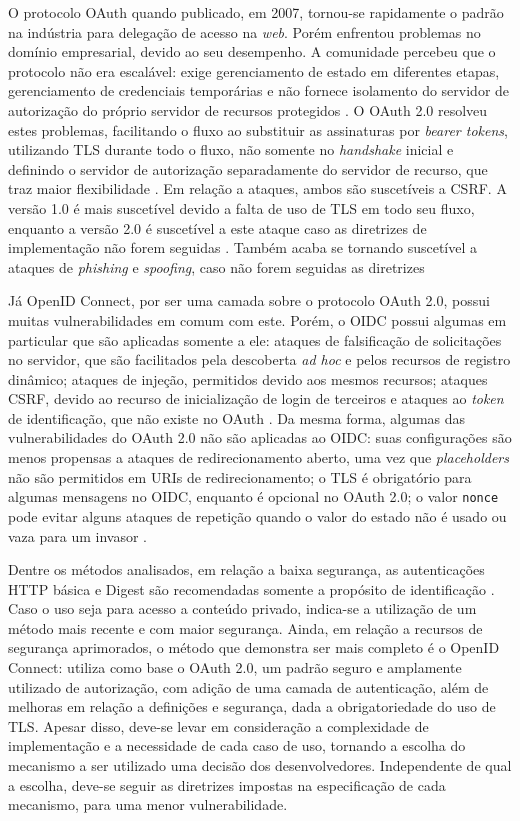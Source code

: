 O protocolo OAuth quando publicado, em 2007, tornou-se rapidamente o padrão na indústria para 
delegação de acesso na \emph{web}. Porém enfrentou problemas no domínio empresarial, devido ao seu desempenho. 
A comunidade percebeu que o protocolo não era escalável: exige gerenciamento de estado em diferentes 
etapas, gerenciamento de credenciais temporárias e não fornece isolamento do servidor de autorização 
do próprio servidor de recursos protegidos \cite{NOUREDDINE2011}. O OAuth 2.0 resolveu estes 
problemas, facilitando o fluxo ao substituir as assinaturas por \emph{bearer tokens}, utilizando TLS 
durante todo o fluxo, não somente no \emph{handshake} inicial e definindo o servidor de autorização 
separadamente do servidor de recurso, que traz maior flexibilidade \cite{SIRIWARDENA2014}.
Em relação a ataques, ambos são suscetíveis a CSRF. A versão 1.0 é mais suscetível devido a 
falta de uso de TLS em todo seu fluxo, enquanto a versão 2.0 é suscetível a este ataque caso as 
diretrizes de implementação não forem seguidas \cite{FETT2016}. Também acaba se tornando suscetível 
a ataques de \emph{phishing} e \emph{spoofing}, caso não forem seguidas as diretrizes \cite{RFC6819}


Já OpenID Connect, por ser uma camada sobre o protocolo OAuth 2.0, possui muitas vulnerabilidades 
em comum com este. Porém, o OIDC possui algumas em particular que são aplicadas somente a
ele: ataques de falsificação de solicitações no servidor, que são facilitados pela descoberta 
\emph{ad hoc} e pelos recursos de registro dinâmico; ataques de injeção, permitidos devido aos mesmos
recursos; ataques CSRF, devido ao recurso de inicialização de login de terceiros e ataques ao
\emph{token} de identificação, que não existe no OAuth \cite{FETT2017}.
Da mesma forma, algumas das vulnerabilidades do OAuth 2.0 não são aplicadas ao OIDC: 
suas configurações são menos propensas a ataques de redirecionamento aberto, uma vez que 
\emph{placeholders} não são permitidos em URIs de redirecionamento; o TLS é obrigatório para 
algumas mensagens no OIDC, enquanto é opcional no OAuth 2.0; o valor \texttt{nonce} pode evitar 
alguns ataques de repetição quando o valor do estado não é usado ou vaza para um invasor 
\cite{FETT2017}.



Dentre os métodos analisados, em relação a baixa segurança, as autenticações HTTP básica e Digest são 
recomendadas somente a propósito de identificação \cite{RFC2617}. Caso o uso seja para acesso a 
conteúdo privado, indica-se a utilização de um método mais recente e com maior segurança. Ainda, em
relação a recursos de segurança aprimorados, o método que demonstra ser mais completo é o OpenID
Connect: utiliza como base o OAuth 2.0, um padrão seguro e amplamente utilizado 
de autorização, com adição de uma camada de autenticação, além de melhoras em relação a definições 
e segurança, dada a obrigatoriedade do uso de TLS. Apesar disso, deve-se levar em consideração a 
complexidade de implementação e a necessidade de cada caso de uso, tornando a escolha do mecanismo
a ser utilizado uma decisão dos desenvolvedores. Independente de qual a escolha, deve-se seguir as
diretrizes impostas na especificação de cada mecanismo, para uma menor vulnerabilidade.